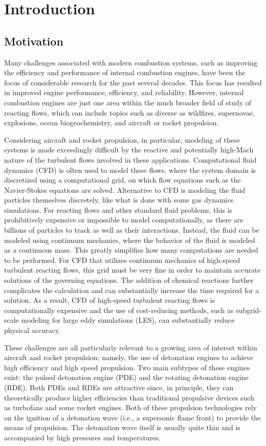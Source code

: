 \chapter{Introduction}
\label{introchap}


\section{Motivation}
Many challenges associated with modern combustion systems, such as improving the efficiency and performance of internal combustion engines, have been the focus of considerable research for the past several decades. This focus has resulted in improved engine performance, efficiency, and reliability. However, internal combustion engines are just one area within the much broader field of study of reacting flows, which can include topics such as diverse as wildfires, supernovae, explosions, ocean biogeochemistry, and aircraft or rocket propulsion.

Considering aircraft and rocket propulsion, in particular, modeling of these systems is made exceedingly difficult by the reactive and potentially high-Mach nature of the turbulent flows involved in these applications. Computational fluid dynamics (CFD) is often used to model these flows, where the system domain is discretized using a computational grid, on which flow equations such as the Navier-Stokes equations are solved. Alternative to CFD is modeling the fluid particles themselves discretely, like what is done with some gas dynamics simulations. For reacting flows and other standard fluid problems, this is prohibitively expensive or impossible to model computationally, as there are billions of particles to track as well as their interactions. Instead, the fluid can be modeled using continuum mechanics, where the behavior of the fluid is modeled as a continuous mass. This greatly simplifies how many computations are needed to be performed. For CFD that utilizes continuum mechanics of high-speed turbulent reacting flows, this grid must be very fine in order to maintain accurate solutions of the governing equations. The addition of chemical reactions further complicates the calculation and can substantially increase the time required for a solution. As a result, CFD of high-speed turbulent reacting flows is computationally expensive and the use of cost-reducing methods, such as subgrid-scale modeling for large eddy simulations (LES), can substantially reduce physical accuracy.  

These challenges are all particularly relevant to a growing area of interest within aircraft and rocket propulsion; namely, the use of detonation engines to achieve high efficiency and high speed propulsion. Two main subtypes of these engines exist: the pulsed detonation engine (PDE) and the rotating detonation engine (RDE). Both PDEs and RDEs are attractive since, in principle, they can theoretically produce higher efficiencies than traditional propulsive devices such as turbofans and some rocket engines. Both of these propulsion technologies rely on the ignition of a detonation wave (i.e., a supersonic flame front) to provide the means of propulsion. The detonation wave itself is usually quite thin and is accompanied by high pressures and temperatures. 

